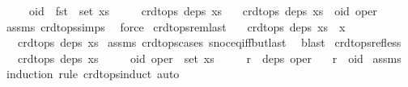 \begin{isabellebody}
\ \ \ \ \ {\isachardoublequoteopen}oid\ {\isasymnotin}\ fst\ {\isacharbackquote}\ set\ xs{\isachardoublequoteclose}\isanewline
\ \ \ \ \ {\isachardoublequoteopen}crdt{\isacharunderscore}ops\ deps\ xs{\isachardoublequoteclose}\isanewline
\ \ \ {\isachardoublequoteopen}crdt{\isacharunderscore}ops\ deps\ {\isacharparenleft}xs\ {\isacharat}\ {\isacharbrackleft}{\isacharparenleft}oid{\isacharcomma}\ oper{\isacharparenright}{\isacharbrackright}{\isacharparenright}{\isachardoublequoteclose}\isanewline
%
\isadelimproof
%
\endisadelimproof
%
\isatagproof
{}\isamarkupfalse%
\ assms\ crdt{\isacharunderscore}ops{\isachardot}simps\ \isamarkupfalse%
\ force%
\endisatagproof
{\isafoldproof}%
%
\isadelimproof
\isanewline
%
\endisadelimproof
\isanewline
{}\isamarkupfalse%
\ crdt{\isacharunderscore}ops{\isacharunderscore}rem{\isacharunderscore}last{\isacharcolon}\isanewline
\ \ \ {\isachardoublequoteopen}crdt{\isacharunderscore}ops\ deps\ {\isacharparenleft}xs\ {\isacharat}\ {\isacharbrackleft}x{\isacharbrackright}{\isacharparenright}{\isachardoublequoteclose}\isanewline
\ \ \ {\isachardoublequoteopen}crdt{\isacharunderscore}ops\ deps\ xs{\isachardoublequoteclose}\isanewline
%
\isadelimproof
%
\endisadelimproof
%
\isatagproof
{}\isamarkupfalse%
\ assms\ crdt{\isacharunderscore}ops{\isachardot}cases\ snoc{\isacharunderscore}eq{\isacharunderscore}iff{\isacharunderscore}butlast\ \isamarkupfalse%
\ blast%
\endisatagproof
{\isafoldproof}%
%
\isadelimproof
\isanewline
%
\endisadelimproof
\isanewline
{}\isamarkupfalse%
\ crdt{\isacharunderscore}ops{\isacharunderscore}ref{\isacharunderscore}less{\isacharcolon}\isanewline
\ \ \ {\isachardoublequoteopen}crdt{\isacharunderscore}ops\ deps\ xs{\isachardoublequoteclose}\isanewline
\ \ \ \ \ {\isachardoublequoteopen}{\isacharparenleft}oid{\isacharcomma}\ oper{\isacharparenright}\ {\isasymin}\ set\ xs{\isachardoublequoteclose}\isanewline
\ \ \ \ \ {\isachardoublequoteopen}r\ {\isasymin}\ deps\ oper{\isachardoublequoteclose}\isanewline
\ \ \ {\isachardoublequoteopen}r\ {\isacharless}\ oid{\isachardoublequoteclose}\isanewline
%
\isadelimproof
%
\endisadelimproof
%
\isatagproof
{}\isamarkupfalse%
\ assms\ \isamarkupfalse%
\ {\isacharparenleft}induction\ rule{\isacharcolon}\ crdt{\isacharunderscore}ops{\isachardot}induct{\isacharcomma}\ auto{\isacharparenright}%
\endisatagproof

\end{isabellebody}
